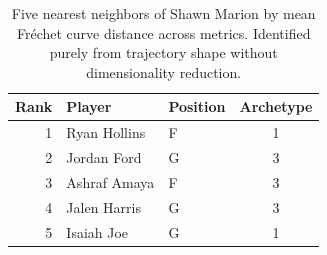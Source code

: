 \begin{table}[htbp]
  \centering\small
  \begin{tabular}{rllc}
    \toprule
    Rank & Player & Position & Archetype \\
    \midrule
    1 & Ryan Hollins & F & 1 \\
    2 & Jordan Ford & G & 3 \\
    3 & Ashraf Amaya & F & 3 \\
    4 & Jalen Harris & G & 3 \\
    5 & Isaiah Joe & G & 1 \\
    \bottomrule
  \end{tabular}
  \caption{Five nearest neighbors of Shawn Marion by mean Fr\'{e}chet curve distance across metrics. Identified purely from trajectory shape without dimensionality reduction.}
  \label{tab:Shawn_Marion_frechet_curve_neighbors}
\end{table}

